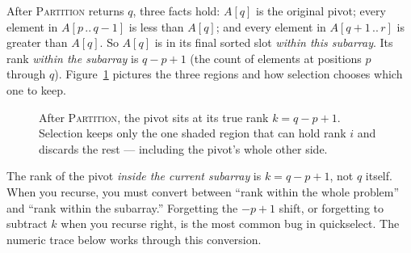 After \textsc{Partition} returns $q$, three facts hold: $A[q]$ is the original
pivot; every element in $A[p\,..\,q-1]$ is less than $A[q]$; and every element in
$A[q+1\,..\,r]$ is greater than $A[q]$. So $A[q]$ is in its final sorted slot
\emph{within this subarray}. Its rank \emph{within the subarray} is $q - p + 1$
(the count of elements at positions $p$ through $q$).
Figure~\ref{ch09:fig-partition-state} pictures the three regions and how selection
chooses which one to keep.

\begin{figure}[H]
\centering
{}
\caption{After \textsc{Partition}, the pivot sits at its true rank $k=q-p+1$.
Selection keeps only the one shaded region that can hold rank $i$ and discards the
rest --- including the pivot's whole other side.}
\label{ch09:fig-partition-state}
\end{figure}

\begin{trapbox}
The rank of the pivot \emph{inside the current subarray} is $k = q - p + 1$, not
$q$ itself. When you recurse, you must convert between ``rank within the whole
problem'' and ``rank within the subarray.'' Forgetting the $-p+1$ shift, or
forgetting to subtract $k$ when you recurse right, is the most common bug in
quickselect. The numeric trace below works through this conversion.
\end{trapbox}

